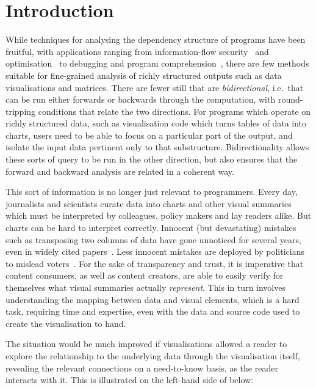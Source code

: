 \section{Introduction}

While techniques for analysing the dependency structure of programs have been fruitful, with applications ranging from information-flow security~\cite{sabelfeld03} and optimisation~\cite{kildall73} to debugging and program comprehension~\cite{weiser81,delucia96}, there are few methods suitable for fine-grained analysis of richly structured outputs such as data visualisations and matrices. There are fewer still that are \emph{bidirectional}, i.e.~that can be run either forwards or backwards through the computation, with round-tripping conditions that relate the two directions. For programs which operate on richly structured data, such as visualisation code which turns tables of data into charts, users need to be able to focus on a particular part of the output, and isolate the input data pertinent only to that substructure. Bidirectionality allows these sorts of query to be run in the other direction, but also ensures that the forward and backward analysis are related in a coherent way.

This sort of information is no longer just relevant to programmers. Every day, journalists and scientists curate data into charts and other visual summaries which must be interpreted by colleagues, policy makers and lay readers alike. But charts can be hard to interpret correctly. Innocent (but devastating) mistakes such as transposing two columns of data have gone unnoticed for several years, even in widely cited papers~\cite{miller06}. Less innocent mistakes are deployed by politicians to mislead voters~\cite{fullfact19}. For the sake of transparency and trust, it is imperative that content consumers, as well as content creators, are able to easily verify for themselves what visual summaries actually \emph{represent}. This in turn involves understanding the mapping between data and visual elements, which is a hard task, requiring time and expertise, even with the data and source code used to create the visualisation to hand.

The situation would be much improved if visualisations allowed a reader to explore the relationship to the underlying data through the visualisation itself, revealing the relevant connections on a need-to-know basis, as the reader interacts with it. This is illustrated on the left-hand side of  below:

